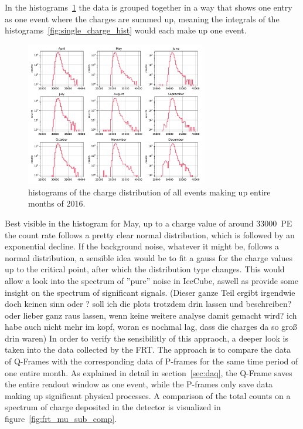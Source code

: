 In the histograms~\ref{fig:monthly_charge_hist} the data is grouped together in a way that shows one entry as one event where the charges are summed up, meaning the 
integrals of the histograms~\ref{fig:single_charge_hist} would each make up one event. 

\begin{figure}
    \centering
    \includegraphics[width=0.7\textwidth]{Plots/monthly_charge_hist.pdf}
    \caption{histograms of the charge distribution of all events making up entire months of 2016.}
    \label{fig:monthly_charge_hist}
\end{figure}

Best visible in the histogram for May, up to a charge value of around \SI{33000}{PE} the count rate follows a pretty clear normal distribution, which is followed 
by an exponential decline. If the background noise, whatever it might be, follows a normal distribution, a sensible idea would be to fit a gauss for the charge 
values up to the critical point, after which the distribution type changes. This would allow a look into the spectrum of ''pure'' noise in IceCube, aswell as provide 
some insight on the spectrum of significant signals. (Dieser ganze Teil ergibt irgendwie doch keinen sinn oder ? soll ich die plots trotzdem drin lassen und 
beschreiben? oder lieber ganz raus lassen, wenn keine weitere analyse damit gemacht wird? ich habe auch nicht mehr im kopf, woran es nochmal lag, dass die charges
da so groß drin waren)
In order to verify the sensibilitly of this appraoch, a deeper look is taken into the data collected by the FRT. The approach is to compare the data of 
Q-Frames with the corresponding data of P-frames for the same time period of one entire month. As explained in detail in section~\ref{sec:daq}, the Q-Frame 
saves the entire readout window as one event, while the P-frames only save data making up significant physical processes. A comparison of the total counts on a 
spectrum of charge deposited in the detector is visualized in figure~\ref{fig:frt_mu_sub_comp}. 

